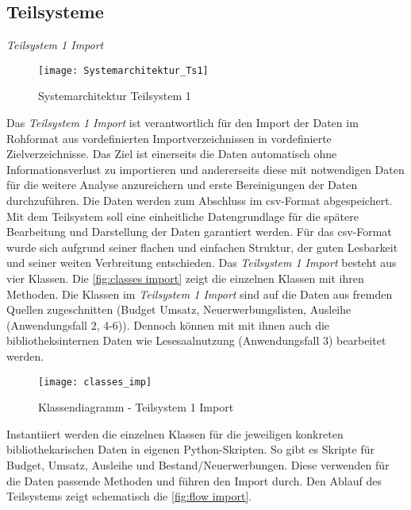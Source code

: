     \subsection{Teilsysteme}
    \label{chap:five_one_three}
    \textit{Teilsystem 1 Import}\\
    \begin{figure}[H]
        \centering
            \texttt{[image: Systemarchitektur\_Ts1]}
            \caption{Systemarchitektur Teilsystem 1}
            \label{fig:Systemarchitektur Teilsystem 1}
    \end{figure}


    Das \textit{Teilsystem 1 Import} ist verantwortlich für den Import der Daten im Rohformat aus vordefinierten Importverzeichnissen 
    in vordefinierte Zielverzeichnisse. Das Ziel ist einerseits die Daten automatisch ohne Informationsverlust zu importieren 
    und andererseits diese mit notwendigen Daten für die weitere Analyse anzureichern und erste Bereinigungen der Daten durchzuführen. 
    Die Daten werden zum Abschluss im csv-Format abgespeichert. Mit dem Teilsystem soll eine einheitliche Datengrundlage für die spätere 
    Bearbeitung und Darstellung der Daten garantiert werden. Für das csv-Format wurde sich aufgrund seiner flachen und einfachen Struktur, der guten Lesbarkeit
    und seiner weiten Verbreitung entschieden.
    Das \textit{Teilsystem 1 Import} besteht aus vier Klassen. Die \autoref{fig:classes import} zeigt die einzelnen Klassen mit ihren Methoden.
    Die Klassen im \textit{Teilsystem 1 Import} sind auf die Daten aus fremden Quellen zugeschnitten
    (Budget Umsatz, Neuerwerbungslisten, Ausleihe (Anwendungsfall 2, 4-6)). Dennoch können mit mit ihnen auch die bibliotheksinternen Daten
    wie Lesesaalnutzung (Anwendungsfall 3) bearbeitet werden. 
    \begin{figure}[H]
        \centering
            \texttt{[image: classes\_imp]}
            \caption{Klassendiagramm - Teilsystem 1 Import}
            \label{fig:classes import}
    \end{figure}

    Instantiiert werden die einzelnen Klassen für die jeweiligen konkreten bibliothekarischen Daten in eigenen Python-Skripten. 
    So gibt es Skripte für Budget, Umsatz, Ausleihe und Bestand/Neuerwerbungen. Diese verwenden für die Daten passende Methoden
    und führen den Import durch.
    Den Ablauf des Teilsystems zeigt schematisch die \autoref{fig:flow import}.


